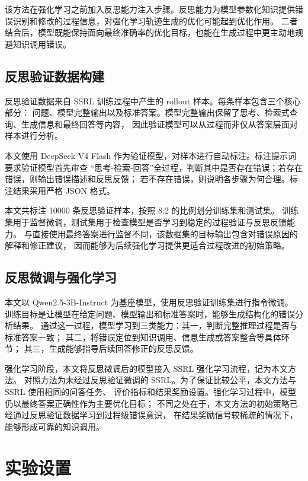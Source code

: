 该方法在强化学习之前加入反思能力注入步骤。反思能力为模型参数化知识提供错误识别和修改的过程信息，对强化学习轨迹生成的优化可能起到优化作用。
二者结合后，模型既能保持面向最终准确率的优化目标，也能在生成过程中更主动地规避知识调用错误。

\subsection{反思验证数据构建}

反思验证数据来自 SSRL 训练过程中产生的 rollout 样本。每条样本包含三个核心部分：
问题、模型完整输出以及标准答案。模型完整输出保留了思考、检索式查询、生成信息和最终回答等内容，
因此验证模型可以从过程而非仅从答案层面对样本进行分析。

本文使用 DeepSeek V4 Flash 作为验证模型，对样本进行自动标注。标注提示词要求验证模型首先审查
“思考-检索-回答”全过程，判断其中是否存在错误；若存在错误，则输出错误描述和反思反馈；
若不存在错误，则说明各步骤为何合理。标注结果采用严格 JSON 格式。

本文共标注 10000 条反思验证样本，按照 8:2 的比例划分训练集和测试集。
训练集用于监督微调，测试集用于检查模型是否学习到稳定的过程验证与反思反馈能力。
与直接使用最终答案进行监督不同，该数据集的目标输出包含对错误原因的解释和修正建议，
因而能够为后续强化学习提供更适合过程改进的初始策略。

\subsection{反思微调与强化学习}

本文以 Qwen2.5-3B-Instruct 为基座模型，使用反思验证训练集进行指令微调。
训练目标是让模型在给定问题、模型输出和标准答案时，能够生成结构化的错误分析结果。
通过这一过程，模型学习到三类能力：其一，判断完整推理过程是否与标准答案一致；
其二，将错误定位到知识调用、信息生成或答案整合等具体环节；
其三，生成能够指导后续回答修正的反思反馈。

强化学习阶段，本文将反思微调后的模型接入 SSRL 强化学习流程，记为本文方法。
对照方法为未经过反思验证微调的 SSRL。为了保证比较公平，本文方法与 SSRL 使用相同的问答任务、
评价指标和结果奖励设置。强化学习过程中，模型仍以最终答案正确性作为主要优化目标；
不同之处在于，本文方法的初始策略已经通过反思验证数据学习到过程级错误意识，
在结果奖励信号较稀疏的情况下，能够形成可靠的知识调用。

\section{实验设置}

